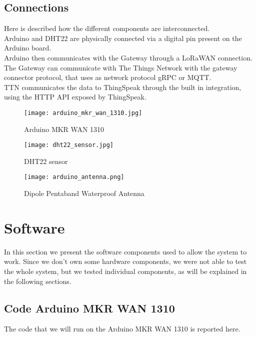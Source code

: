 \subsection{Connections}
Here is described how the different components are interconnected.\\
Arduino and DHT22 are physically connected via a digital pin present on the Arduino board.\\
Arduino then communicates with the Gateway through a LoRaWAN connection.\\
The Gateway can communicate with The Things Network with the gateway connector protocol, that uses as network protocol gRPC or MQTT.\\
TTN communicates the data to ThingSpeak through the built in integration, using the HTTP API exposed by ThingSpeak.\\


\begin{figure}[H]
    \centering
    \texttt{[image: arduino\_mkr\_wan\_1310.jpg]}
    \caption{Arduino MKR WAN 1310}
\end{figure}

\begin{figure}[H]
    \centering
    \texttt{[image: dht22\_sensor.jpg]}
    \caption{DHT22 sensor}
\end{figure}

\begin{figure}[H]
    \centering
    \texttt{[image: arduino\_antenna.png]}
    \caption{Dipole Pentaband Waterproof Antenna}
\end{figure}
\pagebreak
\section{Software}
\label{sec:software}
In this section we present the software components used to allow the system to work. Since we don't own some hardware components, we were not able to test the whole system, but we tested individual components, as will be explained in the following sections.

\subsection{Code Arduino MKR WAN 1310}
The code that we will run on the Arduino MKR WAN 1310 is reported here.

